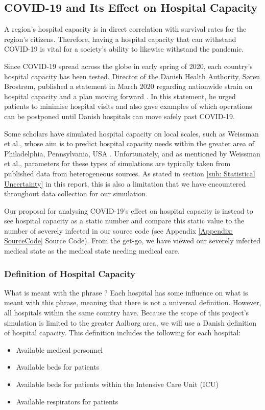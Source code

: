 \subsection{COVID-19 and Its Effect on Hospital Capacity} \label{sub: Hospital Capacity}

A region's hospital capacity is in direct correlation with survival rates for the region's citizens. Therefore, having a hospital capacity that can withstand COVID-19 is vital for a society's ability to likewise withstand the pandemic. 

Since COVID-19 spread across the globe in early spring of 2020, each country's hospital capacity has been tested. Director of the Danish Health Authority, Søren Brostrøm, published a statement in March 2020 regarding nationwide strain on hospital capacity and a plan moving forward \citep{brostrom_notat_2020}. In this statement, he urged patients to minimise hospital visits and also gave examples of which operations can be postponed until Danish hospitals can move safely past COVID-19.

Some scholars have simulated hospital capacity on local scales, such as Weissman et al., whose aim is to predict hospital capacity needs within the greater area of Philadelphia, Pennsylvania, USA \citep{weissman_locally_2020}. Unfortunately, and as mentioned by Weissman et al., parameters for these types of simulations are typically taken from published data from heterogeneous sources. As stated in section \vref{sub: Statistical Uncertainty} in this report, this is also a limitation that we have encountered throughout data collection for our simulation.

Our proposal for analysing COVID-19's effect on hospital capacity is instead to see hospital capacity as a static number and compare this static value to the number of severely infected in our source code (see Appendix \ref{Appendix: SourceCode} Source Code). From the get-go, we have viewed our severely infected medical state as the medical state needing medical care.

\subsubsection{Definition of Hospital Capacity}

What is meant with the phrase ? Each hospital has some influence on what is meant with this phrase, meaning that there is not a universal definition. However, all hospitals within the same country have. Because the scope of this project's simulation is limited to the greater Aalborg area, we will use a Danish definition of hospital capacity. This definition includes the following for each hospital:
\begin{itemize}
\item Available medical personnel
\item Available beds for patients
\item Available beds for patients within the Intensive Care Unit (ICU)
\item Available respirators for patients
\end{itemize}

